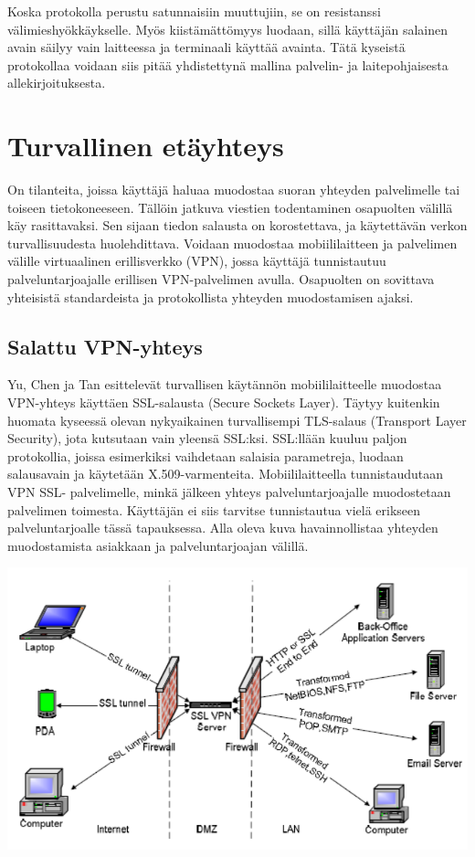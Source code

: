 \documentclass[finnish]{tktltiki2}
\theoremstyle{definition}
\theoremstyle{remark}
\begin{document}
Koska protokolla perustu satunnaisiin muuttujiin, se on resistanssi välimieshyökkäykselle. Myös kiistämättömyys luodaan, sillä käyttäjän salainen avain säilyy vain laitteessa ja terminaali käyttää avainta. Tätä kyseistä protokollaa voidaan siis pitää yhdistettynä mallina palvelin- ja laitepohjaisesta allekirjoituksesta.


\section{Turvallinen etäyhteys}

On tilanteita, joissa käyttäjä haluaa muodostaa suoran yhteyden palvelimelle tai toiseen tietokoneeseen. Tällöin jatkuva viestien todentaminen osapuolten välillä käy rasittavaksi. Sen sijaan tiedon salausta on korostettava, ja käytettävän verkon turvallisuudesta huolehdittava. Voidaan muodostaa mobiililaitteen ja palvelimen välille virtuaalinen erillisverkko (VPN), jossa käyttäjä tunnistautuu palveluntarjoajalle erillisen VPN-palvelimen avulla. Osapuolten on sovittava yhteisistä standardeista ja protokollista yhteyden muodostamisen ajaksi.

\subsection{Salattu VPN-yhteys}

Yu, Chen ja Tan \cite{vpn} esittelevät turvallisen käytännön mobiililaitteelle muodostaa VPN-yhteys käyttäen SSL-salausta (Secure Sockets Layer). Täytyy kuitenkin huomata kyseessä olevan nykyaikainen turvallisempi TLS-salaus (Transport Layer Security), jota kutsutaan vain yleensä SSL:ksi. SSL:llään kuuluu paljon protokollia, joissa esimerkiksi vaihdetaan salaisia parametreja, luodaan salausavain ja käytetään X.509-varmenteita. Mobiililaitteella tunnistaudutaan VPN SSL- palvelimelle, minkä jälkeen yhteys palveluntarjoajalle muodostetaan palvelimen toimesta. Käyttäjän ei siis tarvitse tunnistautua vielä erikseen palveluntarjoalle tässä tapauksessa. Alla oleva kuva havainnollistaa yhteyden muodostamista asiakkaan ja palveluntarjoajan välillä. 

\includegraphics[scale=0.5]{VPN-tunneli}
\end{document}
